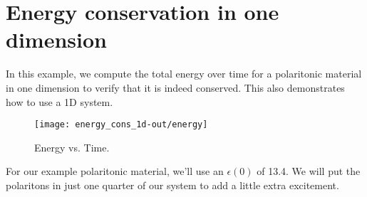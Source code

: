 \begin{comment}
#include <stdio.h>
#include <stdlib.h>
#include <signal.h>
\end{comment}

\section{Energy conservation in one dimension}

In this example, we compute the total energy over time for a polaritonic
material in one dimension to verify that it is indeed conserved.  This also
demonstrates how to use a 1D system.

\begin{figure}
\label{econs_1d}
\caption{Energy vs. Time.}
\texttt{[image: energy\_cons\_1d-out/energy]}
\end{figure}

\begin{comment}
#include <meep.hpp>
using namespace meep;

const double a = 10;
\end{comment}

For our example polaritonic material, we'll use an $\epsilon(0)$ of 13.4.
We will put the polaritons in just one quarter of our system to add a
little extra excitement.

